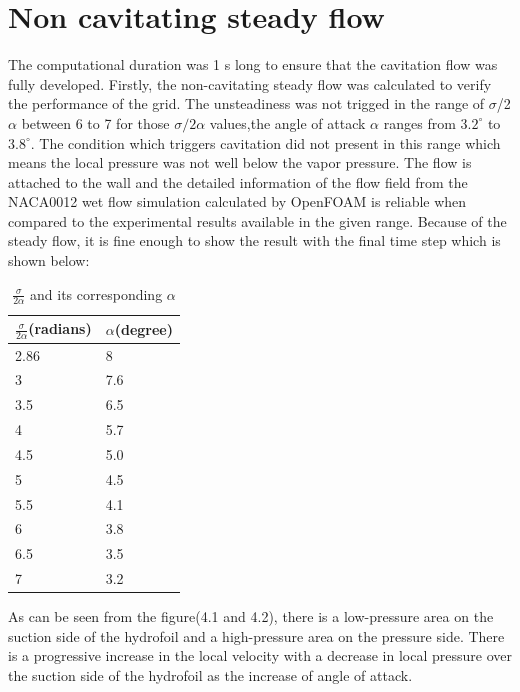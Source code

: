 \section{Non cavitating steady flow}
The computational duration was 1 s long to ensure that the cavitation flow was fully developed. Firstly, 
the non-cavitating steady flow was calculated to verify the performance of the grid. The unsteadiness was not trigged in the range of $\sigma$/{2$\alpha$}  
between 6 to 7 for those ${\sigma}/{2\alpha}$ values,the angle of attack $\alpha$ ranges from $3.2^{\circ}$ to $3.8^{\circ}$. The condition which triggers cavitation did not present
in this range which means the local pressure was not well below the vapor pressure. The flow is attached to the wall  and the detailed 
information of the flow field from the NACA0012 wet flow simulation calculated by OpenFOAM is reliable when compared to the experimental results available in 
the given range. Because of the steady flow, it is fine enough to show the result with the final 
time step which is shown below:\\
\begin{table}[h]
\centering
\begin{tabular}{|l|l|}
\hline
\rowcolor{gray!20} $\frac{\sigma}{2\alpha}$(radians)&$\alpha$(degree) \\ \hline
 2.86&8  \\ \hline
 3& 7.6 \\ \hline
 3.5&6.5  \\ \hline
 4& 5.7 \\ \hline
4.5 &5.0  \\ \hline
5 & 4.5 \\ \hline
 5.5&4.1  \\ \hline
 6& 3.8 \\ \hline
6.5 & 3.5 \\ \hline
 7& 3.2 \\ \hline
\end{tabular}
\caption{$\frac{\sigma}{2\alpha}$ and its corresponding $\alpha$}
\label{}
\end{table}
As can be seen from the figure(4.1 and 4.2), there is a low-pressure area on the suction side of the hydrofoil 
and a high-pressure area on the pressure side. There is a progressive increase in the local velocity 
with a decrease in local pressure over the suction side of the hydrofoil as the 
increase of angle of attack. 

